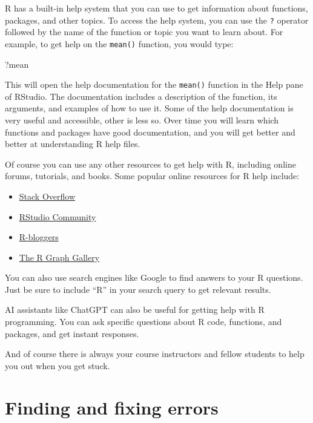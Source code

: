 \documentclass[
  letterpaper,
  8pt,
  a4paper]{book}
\newenvironment{Shaded}{\begin{snugshade}}{\end{snugshade}}
\newcommand{\NormalTok}[1]{\textcolor[rgb]{0.00,0.23,0.31}{#1}}
\providecommand{\tightlist}{%
  \setlength{\itemsep}{0pt}\setlength{\parskip}{0pt}}
\begin{document}

R has a built-in help system that you can use to get information about
functions, packages, and other topics. To access the help system, you
can use the \texttt{?} operator followed by the name of the function or
topic you want to learn about. For example, to get help on the
\texttt{mean()} function, you would type:

\begin{Shaded}
\begin{Highlighting}[]
\NormalTok{?mean}
\end{Highlighting}
\end{Shaded}

This will open the help documentation for the \texttt{mean()} function
in the Help pane of RStudio. The documentation includes a description of
the function, its arguments, and examples of how to use it. Some of the
help documentation is very useful and accessible, other is less so. Over
time you will learn which functions and packages have good
documentation, and you will get better and better at understanding R
help files.

Of course you can use any other resources to get help with R, including
online forums, tutorials, and books. Some popular online resources for R
help include:

\begin{itemize}
\tightlist
\item
  \href{https://stackoverflow.com/questions/tagged/r}{Stack Overflow}
\item
  \href{https://community.rstudio.com/}{RStudio Community}
\item
  \href{https://www.r-bloggers.com/}{R-bloggers}
\item
  \href{https://www.r-graph-gallery.com/}{The R Graph Gallery}
\end{itemize}

You can also use search engines like Google to find answers to your R
questions. Just be sure to include ``R'' in your search query to get
relevant results.

AI assistants like ChatGPT can also be useful for getting help with R
programming. You can ask specific questions about R code, functions, and
packages, and get instant responses.

And of course there is always your course instructors and fellow
students to help you out when you get stuck.

\section*{Finding and fixing errors}\label{finding-and-fixing-errors}
\end{document}

